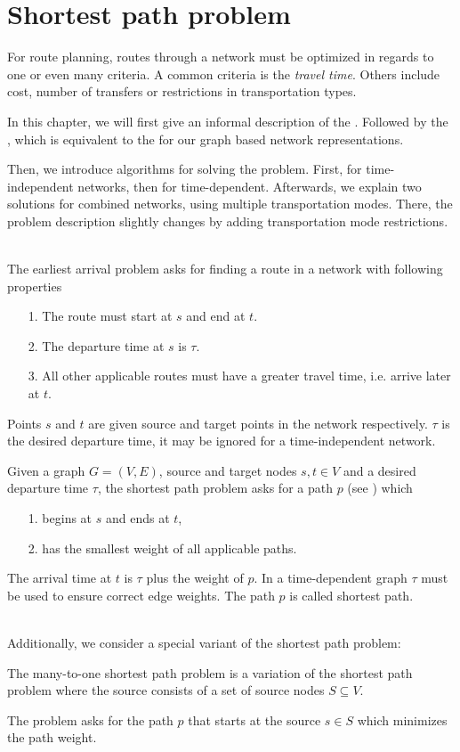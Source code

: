 \chapter{Shortest path problem}\label{shortestPathProblem}
	For route planning, routes through a network must be optimized in regards to one or even many criteria.
	A common criteria is the \textit{travel time}. Others include cost, number of transfers or restrictions
	in transportation types.
	
	In this chapter, we will first give an informal description of the \earliestArrivalProblem. Followed by
	the \shortestPathProblem, which is equivalent to the \earliestArrivalProblem for our graph based network
	representations.
	
	Then, we introduce algorithms for solving the problem. First, for time-independent networks, then for time-dependent.
	Afterwards, we explain two solutions for combined networks, using multiple transportation modes. There, the problem
	description slightly changes by adding transportation mode restrictions.\\\\
	\begin{mydef}
		The earliest arrival problem asks for finding a \textnormal{route} in a network with following properties
		\begin{itemize}
			\item[1.] The route must start at $s$ and end at $t$.
			\item[2.] The departure time at $s$ is $\tau$.
			\item[3.] All other applicable routes must have a greater travel time, i.e. arrive later at $t$.
		\end{itemize}
		Points $s$ and $t$ are given source and target points in the network respectively. $\tau$ is the desired departure time,
		it may be ignored for a time-independent network.
	\end{mydef}
	\begin{mydef}
		Given a graph $G = (V, E)$, source and target nodes $s, t \in V$ and a desired departure time $\tau$, the shortest path
		problem asks for a path $p$ (see ) which
		\begin{itemize}
			\item[1.] begins at $s$ and ends at $t$,
			\item[2.] has the smallest weight of all applicable paths.
		\end{itemize}
		The arrival time at $t$ is $\tau$ plus the weight of $p$. In a time-dependent
		graph $\tau$ must be used to ensure correct edge weights. The path $p$ is called \textnormal{shortest path}.
	\end{mydef}\quad\\
	Additionally, we consider a special variant of the shortest path problem:
	\begin{mydef}
		The many-to-one shortest path problem is a variation of the shortest path problem
		where the source consists of a set of source nodes $S \subseteq V$.

		The problem asks for the path $p$ that starts at the source $s \in S$ which minimizes the path weight.
	\end{mydef}

